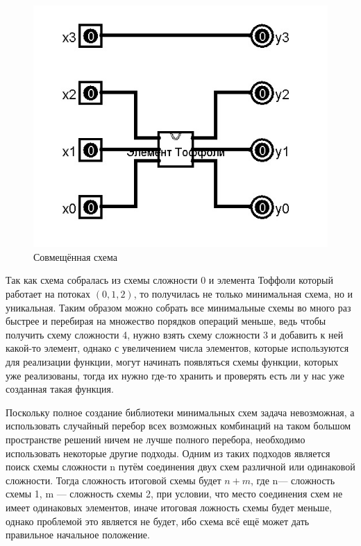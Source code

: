 \documentclass[14pt]{extarticle} %
\begin{document}
 \begin{figure}[h]
 	\centering
 	\caption{Совмещённая схема}
 	\includegraphics[scale=0.5]{img/added.jpg}
 	
 	\label{circuit_sup}
 \end{figure}
Так как схема собралась из схемы сложности 0 и элемента Тоффоли который работает на потоках $(0, 1, 2)$, то получилась не только минимальная схема, но и уникальная. Таким образом можно собрать все минимальные схемы во много раз быстрее и перебирая на множество порядков операций меньше, ведь чтобы получить схему сложности 4, нужно взять схему сложности 3 и добавить к ней какой-то элемент, однако с увеличением числа элементов, которые используются для реализации функции, могут начинать появляться схемы функции, которых уже реализованы, тогда их нужно где-то хранить и проверять есть ли у нас уже созданная такая функция.










Поскольку полное создание библиотеки минимальных схем задача невозможная, а использовать случайный перебор всех возможных комбинаций на таком большом пространстве решений ничем не лучше полного перебора, необходимо использовать некоторые другие подходы. Одним из таких подходов является поиск схемы сложности n путём соединения двух схем различной или одинаковой сложности. Тогда сложность итоговой схемы будет $n+m$, где n--- сложность схемы 1, m --- сложность схемы 2, при условии, что место соединения схем не имеет одинаковых элементов, иначе итоговая ложность схемы будет меньше, однако проблемой это является не будет, ибо схема всё ещё может дать правильное начальное положение.
\end{document}
